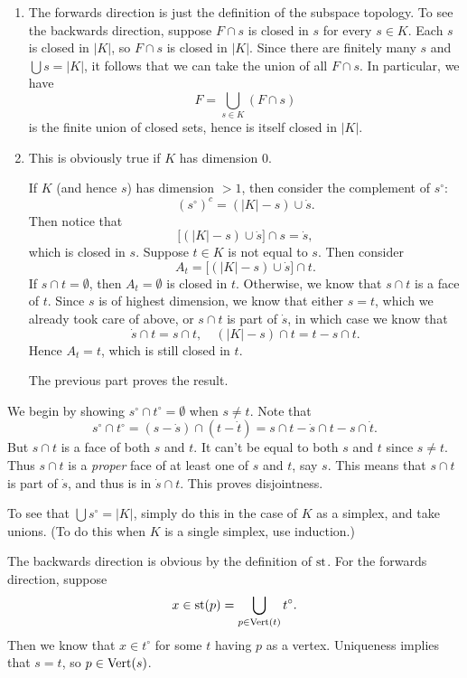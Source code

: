 \documentclass[../../solutions.tex]{subfiles}
\begin{document}
\begin{exercise} \leavevmode
\begin{enumerate}
\item
The forwards direction is just the definition of the subspace topology.
To see the backwards direction, suppose $F\cap s$ is closed in $s$ for every $s\in K$.
Each $s$ is closed in $|K|$, so $F\cap s$ is closed in $|K|$.
Since there are finitely many $s$ and $\bigcup s=|K|$, it follows that we can take the union of all $F\cap s$.
In particular, we have
\[F=\bigcup_{s\in K}(F\cap s)\]
is the finite union of closed sets, hence is itself closed in $|K|$.

\item
This is obviously true if $K$ has dimension 0.

If $K$ (and hence $s$) has dimension $>1$, then consider the complement of $s^\circ$:
\[(s^\circ)^c=(|K|-s)\cup\dot s.\]
Then notice that
\[\big[(|K|-s)\cup\dot s\big]\cap s=\dot s,\]
which is closed in $s$.
Suppose $t\in K$ is not equal to $s$.
Then consider
\[A_t=\big[(|K|-s)\cup\dot s\big]\cap t.\]
If $s\cap t=\emptyset$, then $A_t=\emptyset$ is closed in $t$.
Otherwise, we know that $s\cap t$ is a face of $t$.
Since $s$ is of highest dimension, we know that either $s=t$, which we already took care of above, or $s\cap t$ is part of $\dot s$, in which case we know that
\[\dot s\cap t=s\cap t,\quad(|K|-s)\cap t=t-s\cap t.\]
Hence $A_t=t$, which is still closed in $t$.

The previous part proves the result.
\end{enumerate}
\end{exercise}

\begin{exercise} \leavevmode
We begin by showing $s^\circ\cap t^\circ=\emptyset$ when $s\ne t$.
Note that
\[s^\circ\cap t^\circ=(s-\dot s)\cap(t-\dot t)=s\cap t-\dot s\cap t-s\cap\dot t.\]
But $s\cap t$ is a face of both $s$ and $t$.
It can't be equal to both $s$ and $t$ since $s\ne t$.
Thus $s\cap t$ is a \textit{proper} face of at least one of $s$ and $t$, say $s$.
This means that $s\cap t$ is part of $\dot s$, and thus is in $\dot s\cap t$.
This proves disjointness.

To see that $\bigcup s^\circ=|K|$, simply do this in the case of $K$ as a simplex, and take unions.
(To do this when $K$ is a single simplex, use induction.)
\end{exercise}

\begin{exercise} \leavevmode
The backwards direction is obvious by the definition of $\operatorname{st}$.
For the forwards direction, suppose
\[x\in\operatorname{st}(p)=\bigcup_{p\in\operatorname{Vert}(t)}t^\circ.\]
Then we know that $x\in t^\circ$ for some $t$ having $p$ as a vertex.
Uniqueness implies that $s=t$, so $p\in\operatorname{Vert}(s)$.
\end{exercise}
\end{document}
